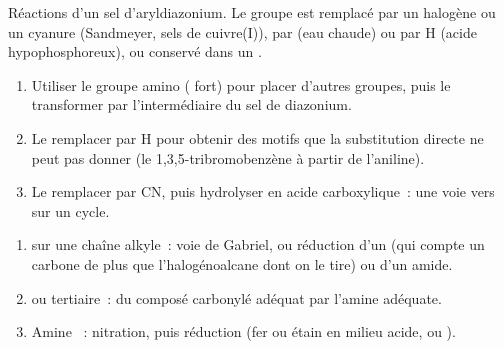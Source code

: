 \begin{omfigure}

{\small Réactions d'un sel d'aryldiazonium. Le groupe  est remplacé par un halogène ou
un cyanure (Sandmeyer, sels de cuivre(I)), par  (eau chaude) ou par H (acide
hypophosphoreux), ou conservé dans un .}
\end{omfigure}

\begin{method}\label{met:b2:amines:diazonium-routes}
\begin{enumerate}
  \item Utiliser le groupe amino ( fort) pour placer d'autres groupes, puis le
        transformer par l'intermédiaire du sel de diazonium.
  \item Le remplacer par H pour obtenir des motifs que la substitution directe ne peut pas donner
        (le 1,3,5-tribromobenzène à partir de l'aniline).
  \item Le remplacer par CN, puis hydrolyser en acide carboxylique~: une voie vers  sur un cycle.
\end{enumerate}
\end{method}

\begin{method}\label{met:b2:amines:make-amine}
\begin{enumerate}
  \item {} sur une chaîne alkyle~: voie de Gabriel, ou réduction d'un  (qui
        compte un carbone de plus que l'halogénoalcane dont on le tire) ou d'un amide.
  \item {} ou tertiaire~:  du composé carbonylé adéquat par
        l'amine adéquate.
  \item Amine ~: nitration, puis réduction (fer ou étain en milieu acide, ou
        ).
\end{enumerate}
\end{method}

